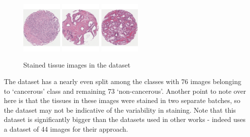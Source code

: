 \begin{figure}
\includegraphics[width=2.0cm]{figs/41_red.pdf}
\includegraphics[width=2.0cm]{figs/108_green.pdf}
\includegraphics[width=2.0cm]{figs/109_red.pdf}
\caption{Stained tissue images in the dataset}
\label{fig:TissueImageExample}

\end{figure}  
  

The dataset has a nearly even split among the classes with 76 images belonging to `cancerous' class and remaining 73 `non-cancerous'. Another point to note over here is that the tissues in these images were stained in two separate batches, so the dataset may not be indicative of the variability in staining. Note that this dataset is significantly bigger than the datasets used in other works - indeed \cite{naik2007gland} uses a dataset of 44 images for their approach.